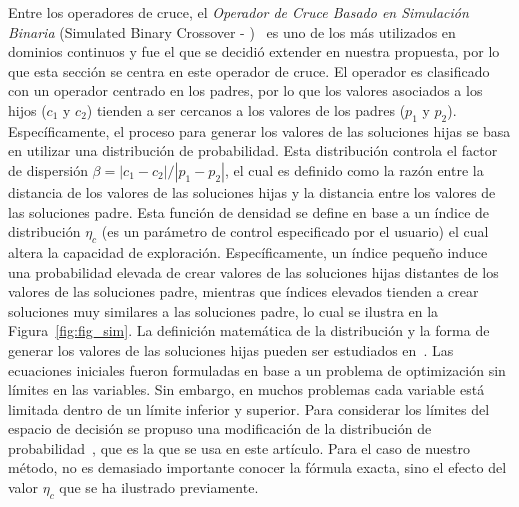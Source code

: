 Entre los operadores de cruce, el \textit{Operador de Cruce Basado en Simulación Binaria} (Simulated Binary Crossover - \SBX{})~\cite{deb1994simulated}
es uno de los más utilizados en dominios continuos y fue el que se decidió extender en nuestra propuesta, por lo que esta sección se centra en este operador de cruce.
%
El operador \SBX{} es clasificado con un operador centrado en los padres, por lo que los valores asociados a los hijos ($c_1$ y $c_2$) 
tienden a ser cercanos a los valores de los padres ($p_1$ y $p_2$).
%
Específicamente, el proceso para generar los valores de las soluciones hijas se basa en utilizar una distribución de probabilidad.
%
Esta distribución controla el factor de dispersión $\beta = |c_1 - c_2 | / |p_1 - p_2|$, el cual es definido como la razón entre la distancia de los valores de las soluciones hijas
y la distancia entre los valores de las soluciones padre.
%
Esta función de densidad se define en base a un índice de distribución $\eta_c$ (es un parámetro de control especificado por el usuario) 
el cual altera la capacidad de exploración.
%
Específicamente, un índice pequeño induce una probabilidad elevada de crear valores de las soluciones hijas distantes de los valores de las 
soluciones padre, mientras que índices elevados tienden a crear soluciones muy similares a las soluciones padre, lo cual se ilustra
en la Figura~\ref{fig:fig_sim}.
%
La definición matemática de la distribución y la forma de generar los valores de las soluciones hijas pueden ser estudiados en~\cite{deb1994simulated}.
%
Las ecuaciones iniciales fueron formuladas en base a un problema de optimización sin límites en las variables.
%
Sin embargo, en muchos problemas cada variable está limitada dentro de un límite inferior y superior.
%
Para considerar los límites del espacio de decisión se propuso una modificación de la distribución de probabilidad~\cite{deb1999self}, 
que es la que se usa en este artículo.
%
Para el caso de nuestro método, no es demasiado importante conocer la fórmula exacta, sino el efecto del valor $\eta_c$ que se ha ilustrado previamente.


%




